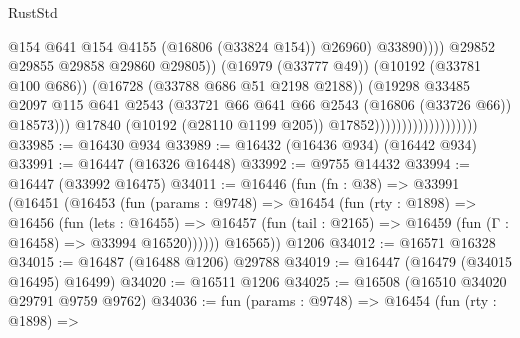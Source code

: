 \begin{lexlean}{RustStd}
\begin{coremodule}
                                                          @154
                                                          @641
                                                          @154
                                                          @4155
                                                          (@16806 (@33824 @154))
                                                          @26960)
                                                        @33890))))
                                                @29852
                                                @29855
                                                @29858
                                                @29860
                                                @29805))
                                            (@16979 (@33777 @49))
                                            (@10192 (@33781 @100 @686))
                                            (@16728 (@33788 @686 @51 @2198 @2188))
                                            (@19298
                                              @33485
                                              @2097
                                              @115
                                              @641
                                              @2543
                                              (@33721
                                                @66
                                                @641
                                                @66
                                                @2543
                                                (@16806 (@33726 @66))
                                                @18573)))
                                          @17840
                                          (@10192 (@28110 @1199 @205))
                                          @17852)))))))))))))))))))
@33985 := @16430 @934
@33989 := @16432 (@16436 @934) (@16442 @934)
@33991 := @16447 (@16326 @16448)
@33992 := @9755 @14432
@33994 := @16447 (@33992 @16475)
@34011 := @16446
    (fun (fn : @38) =>
    @33991
      (@16451
        (@16453
          (fun (params : @9748) =>
          @16454
            (fun (rty : @1898) =>
            @16456
              (fun (lets : @16455) =>
              @16457 (fun (tail : @2165) => @16459 (fun (Γ : @16458) => @33994 @16520))))))
        @16565))
    @1206
@34012 := @16571 @16328
@34015 := @16487 (@16488 @1206) @29788
@34019 := @16447 (@16479 (@34015 @16495) @16499)
@34020 := @16511 @1206
@34025 := @16508 (@16510 @34020 @29791 @9759 @9762)
@34036 := fun (params : @9748) =>
  @16454
    (fun (rty : @1898) =>

\end{coremodule}
\end{lexlean}
